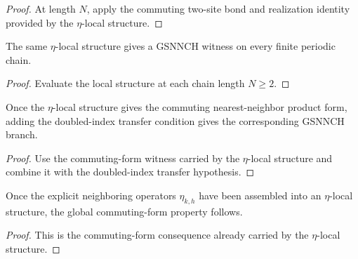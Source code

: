 \begin{proof}\leanok
    At length $N$, apply the commuting two-site bond and realization identity
    provided by the $\eta$-local structure.
\end{proof}

\begin{theorem}
    \label{thm:mpdo_eta_local_structure_is_gsnnch}
    \leanok
    The same $\eta$-local structure gives a GSNNCH witness on every finite
    periodic chain.
\end{theorem}

\begin{proof}\leanok
    Evaluate the local structure at each chain length $N \ge 2$.
\end{proof}

\begin{theorem}
    \label{thm:mpdo_eta_local_structure_is_gsnnch_zcl}
    \leanok
    Once the $\eta$-local structure gives the commuting nearest-neighbor
    product form, adding the doubled-index transfer condition gives the
    corresponding GSNNCH branch.
\end{theorem}

\begin{proof}\leanok
    Use the commuting-form witness carried by the $\eta$-local structure and
    combine it with the doubled-index transfer hypothesis.
\end{proof}

\begin{theorem}
    \label{thm:mpdo_has_commuting_form_of_eta_local_structure}
    \leanok
    Once the explicit neighboring operators $\eta_{k,h}$ have been assembled
    into an $\eta$-local structure, the global commuting-form property follows.
\end{theorem}

\begin{proof}\leanok
    This is the commuting-form consequence already carried by the
    $\eta$-local structure.
\end{proof}

